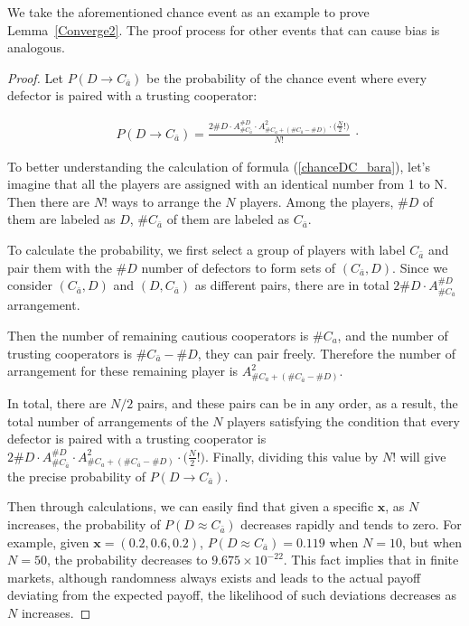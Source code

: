 \documentclass[letterpaper,10pt]{article}
\numberwithin{equation}{section}
\begin{document}
We take the aforementioned chance event as an example to prove Lemma~\ref{Converge2}. The proof process for other events that can cause bias is analogous.

\begin{proof}
    Let $ P(D \to C_{\bar{a}}) $ be the probability of the chance event where every defector is paired with a trusting cooperator:

    \begin{equation}
        \label{chanceDC_bara}
        \begin{split}
            P(D \to C_{\bar{a}}) = \frac{2\#D \cdot \mathit{A}_{\#C_{\bar{a}}}^{\#D} \cdot \mathit{A}_{\#C_{a}+(\#C_{\bar{a}} - \# D)}^{2} \cdot \bigl(\frac{N}{2}!\bigr)}{N!}
        \end{split}.
    \end{equation}

    To better understanding the calculation of formula (\ref{chanceDC_bara}), let's imagine that all the players are assigned with an identical number from 1 to N. Then there are $ N! $ ways to arrange the $ N $ players. Among the players, $ \#D $ of them are labeled as $ D $, $ \#C_{\bar{a}} $ of them are labeled as $ C_{\bar{a}} $.
    
    To calculate the probability, we first select a group of players with label $ C_{\bar{a}} $ and pair them with the $ \#D $ number of defectors to form sets of $ (C_{\bar{a}}, D) $. Since we consider $ (C_{\bar{a}}, D) $ and $ (D, C_{\bar{a}}) $ as different pairs, there are in total $ 2\#D \cdot \mathit{A}_{\#C_{\bar{a}}}^{\#D} $ arrangement.
    
    Then the number of remaining cautious cooperators is $ \#C_{a} $, and the number of trusting cooperators is $ \#C_{\bar{a}} - \#D $, they can pair freely. Therefore the number of arrangement for these remaining player is $ \mathit{A}_{\#C_{a}+(\#C_{\bar{a}} - \# D)}^{2} $.
    
    In total, there are $ N/2 $ pairs, and these pairs can be in any order, as a result, the total number of arrangements of the $ N $ players satisfying the condition that every defector is paired with a trusting cooperator is $ 2\#D \cdot \mathit{A}_{\#C_{\bar{a}}}^{\#D} \cdot \mathit{A}_{\#C_{a}+(\#C_{\bar{a}} - \# D)}^{2} \cdot \bigl(\frac{N}{2}!\bigr) $. Finally, dividing this value by $ N! $ will give the precise probability of $ P(D \to C_{\bar{a}}) $.

    Then through calculations, we can easily find that given a specific $ \mathbf{x} $, as $ N $ increases, the probability of $ P(D \approx C_{\bar{a}}) $ decreases rapidly and tends to zero. For example, given $ \mathbf{x} = (0.2, 0.6, 0.2) $, $ P(D \approx C_{\bar{a}}) = 0.119 $ when $ N = 10 $, but when $ N = 50 $, the probability decreases to $ 9.675\times 10^{-22} $. This fact implies that in finite markets, although randomness always exists and leads to the actual payoff deviating from the expected payoff, the likelihood of such deviations decreases as $ N $ increases.
\end{proof}
\end{document}
